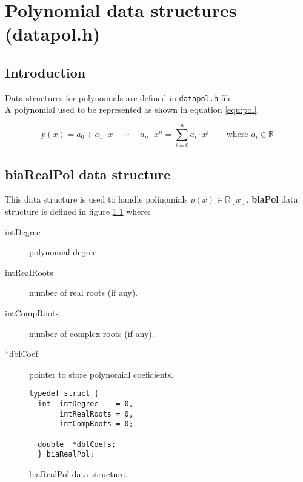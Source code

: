 %
%

\chapter{Polynomial data structures (datapol.h)}

\section{Introduction}

Data structures for polynomials are defined in \texttt{datapol.h} file.\\

A polynomial used to be represented as shown in equation \ref{equ:pol}.

\begin{equation} \label{equ:pol}
p(x) = a_0 + a_1 \cdot x + \cdots + a_n \cdot x^n = \sum_{i=0}^n a_i \cdot x^i \qquad \textrm{where } a_i \in \mathbb{R}
\end{equation}

\section{\textbf{biaRealPol} data structure} \label{sec:biaRealPol}

This data structure is used to handle polinomials $p(x) \in \mathbb{R}[x]$. \textbf{biaPol} data structure is defined in figure \ref{fig:biaRealPol} where:

\begin{description}
\item[intDegree] polynomial degree.
\item[intRealRoots] number of real roots (if any).
\item[intCompRoots] number of complex roots (if any).
\item[*dblCoef] pointer to store polynomial coeficients.
\end{description}

\begin{figure}[!h]
\begin{verbatim}
typedef struct {
  int  intDegree    = 0,
       intRealRoots = 0,
       intCompRoots = 0;

  double  *dblCoefs;
  } biaRealPol;
\end{verbatim}
\caption{biaRealPol data structure.} \label{fig:biaRealPol}
\end{figure}

\FloatBarrier

